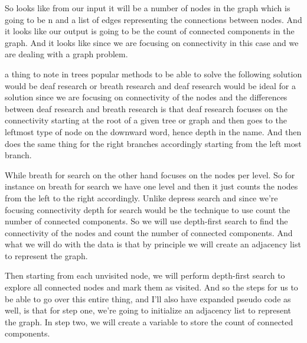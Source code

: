 \expandafter\def\csname sourceexcerpt@42\endcsname{%
So looks like from our input it will be a number of nodes in the graph which is going
to be n and a list of edges representing the connections between nodes. And it looks
like our output is going to be the count of connected components in the graph. And it
looks like since we are focusing on connectivity in this case and we are dealing with
a graph problem.

a thing to note in trees popular methods to be able to solve the following solution
would be deaf research or breath research and deaf research would be ideal for a
solution since we are focusing on connectivity of the nodes and the differences
between deaf research and breath research is that deaf research focuses on the
connectivity starting at the root of a given tree or graph and then goes to the
leftmost type of node on the downward word, hence depth in the name. And then does the
same thing for the right branches accordingly starting from the left most branch.

While breath for search on the other hand focuses on the nodes per level. So for
instance on breath for search we have one level and then it just counts the nodes from
the left to the right accordingly. Unlike depress search and since we're focusing
connectivity depth for search would be the technique to use count the number of
connected components. So we will use depth-first search to find the connectivity of the
nodes and count the number of connected components. And what we will do with the data
is that by principle we will create an adjacency list to represent the graph.

Then starting from each unvisited node, we will perform depth-first search to explore all
connected nodes and mark them as visited. And so the steps for us to be able to go
over this entire thing, and I'll also have expanded pseudo code as well, is that for
step one, we're going to initialize an adjacency list to represent the graph. In step
two, we will create a variable to store the count of connected components.
}


